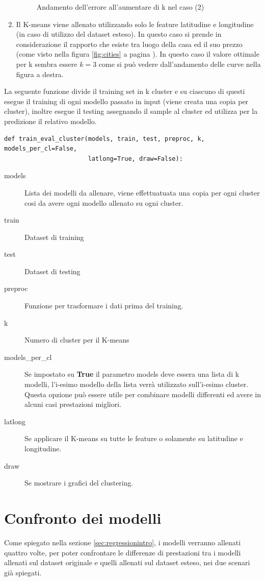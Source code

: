 \documentclass{article}
\begin{document}
\begin{enumerate}
\begin{figure}[ht]
\begin{minipage}{0.48\textwidth}
				\caption{Andamento dell'errore all'aumentare di k nel caso (2)}
			\end{minipage}
		\end{figure}
	\item Il K-means viene allenato utilizzando solo le feature latitudine
		e longitudine (in caso di utilizzo del dataset esteso). In questo caso
		si prende in considerazione il rapporto che esiste tra luogo della casa
		ed il suo prezzo (come visto nella figura \ref{fig:cities} a pagina
		\pageref{fig:cities}). In questo caso il valore ottimale per k sembra
		essere $k=3$ come si può vedere dall'andamento delle curve nella
		figura a destra.
\end{enumerate}

La seguente funzione divide il training set in k cluster e su ciascuno di
questi esegue il training di ogni modello passato in input (viene creata una
copia per cluster), inoltre esegue il testing assegnando il sample al
cluster ed utilizza per la predizione il relativo modello.
\begin{verbatim}
def train_eval_cluster(models, train, test, preproc, k, models_per_cl=False, 
                       latlong=True, draw=False):
\end{verbatim}
\begin{description}
	\item[models] Lista dei modelli da allenare, viene effettuatuata una copia
		per ogni cluster cosi da avere ogni modello allenato su ogni cluster.
	\item[train] Dataset di training
	\item[test] Dataset di testing
	\item[preproc] Funzione per trasformare i dati prima del training.
	\item[k] Numero di cluster per il K-means
	\item[models\_per\_cl] Se impostato su \textbf{True} il parametro models
		deve essera una lista di k modelli, l'i-esimo modello della lista verrà
		utilizzato sull'i-esimo cluster. Questa opzione può essere utile per
		combinare modelli differenti ed avere in alcuni casi prestazioni
		migliori.
	\item[latlong] Se applicare il K-means su tutte le feature o solamente su
		latitudine e longitudine.
	\item[draw] Se mostrare i grafici del clustering.
\end{description}
\newpage

\section{Confronto dei modelli}
Come spiegato nella sezione \ref{sec:regressionintro}, i modelli verranno
allenati quattro volte, per poter confrontare le differenze di prestazioni tra
i modelli allenati sul dataset originale e quelli allenati sul dataset esteso,
nei due scenari già spiegati.
\end{document}
